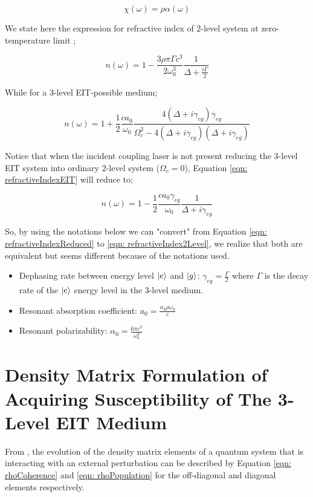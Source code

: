 \begin{equation}
    \chi(\omega) = \rho \alpha(\omega)
\end{equation}

We state here the expression for refractive index of 2-level system at zero-temperature limit \cite{Kwong2017};

\begin{equation}
    n(\omega) = 1 - \frac{3\rho\pi\Gamma c^{3}}{2\omega_{0}^{3}} \frac{1}{\Delta + \frac{i\Gamma}{2}}
    \label{eqn: refractiveIndex2Level}
\end{equation}

While for a 3-level EIT-possible medium;

\begin{equation}
    n(\omega) = 1 + \frac{1}{2} \frac{c a_{0}}{\omega_{0}} \frac{4(\Delta + i\gamma_{cg})\gamma_{eg}}{\Omega_{c}^{2} - 4(\Delta + i\gamma_{cg})(\Delta + i\gamma_{eg})}
    \label{eqn: refractiveIndexEIT}
\end{equation}

Notice that when the incident coupling laser is not present reducing the 3-level EIT system into ordinary 2-level system ($\Omega_{c} = 0$), Equation \ref{eqn: refractiveIndexEIT} will reduce to;

\begin{equation}
    n(\omega) = 1 - \frac{1}{2} \frac{c a_{0} \gamma_{eg}}{\omega_{0}} \frac{1}{\Delta + i\gamma_{eg}}
    \label{eqn: refractiveIndexReduced}
\end{equation}

So, by using the notations below we can "convert" from Equation \ref{eqn: refractiveIndexReduced} to \ref{eqn: refractiveIndex2Level}, we realize that both are equivalent but seems different because of the notations used.

\begin{itemize}
    \item Dephasing rate between energy level $\ket{e}$ and $\ket{g}$: $\gamma_{eg} = \frac{\Gamma}{2}$ where $\Gamma$ is the decay rate of the $\ket{e}$ energy level in the 3-level medium. 
    \item Resonant absorption coefficient: $a_{0} = \frac{\alpha_{0} \rho \omega_{0}}{c}$
    \item Resonant polarizability: $\alpha_{0} = \frac{6\pi c^{3}}{\omega_{0}^{3}}$
\end{itemize}


\section{Density Matrix Formulation of Acquiring Susceptibility of The 3-Level EIT Medium}
From \cite{boyd2020nonlinear}, the evolution of the density matrix elements of a quantum system that is interacting with an external perturbation can be described by Equation \ref{eqn: rhoCoherence} and \ref{eqn: rhoPopulation} for the off-diagonal and diagonal elements respectively.

